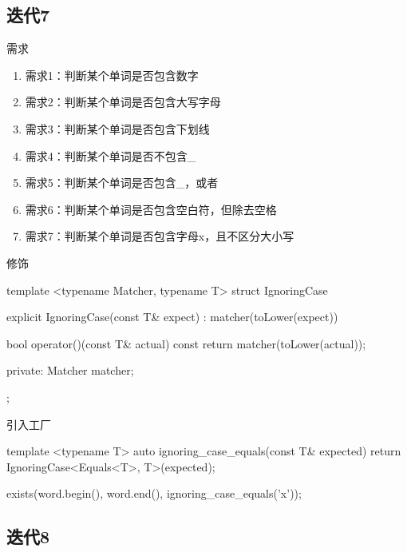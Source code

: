 \subsection{迭代7}

\begin{frame}{需求}
  \begin{block}{}
    \begin{enumerate}
    \item \alert{需求1}：判断某个单词是否包含数字
    \item \alert{需求2}：判断某个单词是否包含大写字母
    \item \alert{需求3}：判断某个单词是否包含下划线 
    \item \alert{需求4}：判断某个单词是否不包含\_
    \item \alert{需求5}：判断某个单词是否包含\_，或者\*     
    \item \alert{需求6}：判断某个单词是否包含空白符，但除去空格
    \item<alert@1-> 需求7：判断某个单词是否包含字母x，且不区分大小写
    \end{enumerate}
  \end{block}
\end{frame}

\begin{frame}[fragile]{修饰}
  \begin{c++}
  template <typename Matcher, typename T>
  struct IgnoringCase {
    explicit IgnoringCase(const T& expect)
      : matcher(toLower(expect))
    {}

    bool operator()(const T& actual) const {
      return matcher(toLower(actual));
    }

  private:
    Matcher matcher;
  };
  \end{c++}
\end{frame}

\begin{frame}[fragile]{引入工厂}
  \begin{c++}
  template <typename T>
  auto ignoring_case_equals(const T& expected) {
    return IgnoringCase<Equals<T>, T>(expected);
  }  

  exists(word.begin(), word.end(), ignoring_case_equals('x'));
  \end{c++}
\end{frame}

\subsection{迭代8}

